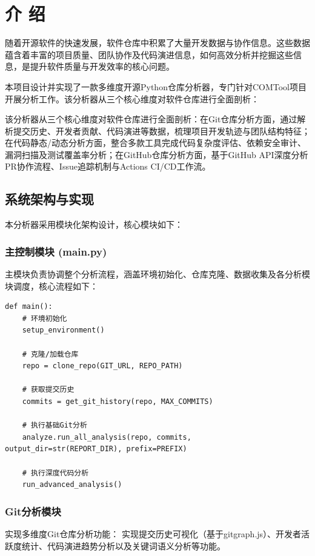 \chapter*{\hfill 介  绍 \hfill}
\label{chap00:introduction}

随着开源软件的快速发展，软件仓库中积累了大量开发数据与协作信息。这些数据蕴含着丰富的项目质量、团队协作及代码演进信息，如何高效分析并挖掘这些信息，是提升软件质量与开发效率的核心问题。

本项目设计并实现了一款多维度开源Python仓库分析器，专门针对COMTool项目开展分析工作。该分析器从三个核心维度对软件仓库进行全面剖析：

该分析器从三个核心维度对软件仓库进行全面剖析：在Git仓库分析方面，通过解析提交历史、开发者贡献、代码演进等数据，梳理项目开发轨迹与团队结构特征；在代码静态/动态分析方面，整合多款工具完成代码复杂度评估、依赖安全审计、漏洞扫描及测试覆盖率分析；在GitHub仓库分析方面，基于GitHub API深度分析PR协作流程、Issue追踪机制与Actions CI/CD工作流。

\section{系统架构与实现}

本分析器采用模块化架构设计，核心模块如下：

\subsection{主控制模块 (main.py)}
主模块负责协调整个分析流程，涵盖环境初始化、仓库克隆、数据收集及各分析模块调度，核心流程如下：

\begin{verbatim}
def main():
    # 环境初始化
    setup_environment()

    # 克隆/加载仓库
    repo = clone_repo(GIT_URL, REPO_PATH)

    # 获取提交历史
    commits = get_git_history(repo, MAX_COMMITS)

    # 执行基础Git分析
    analyze.run_all_analysis(repo, commits, output_dir=str(REPORT_DIR), prefix=PREFIX)

    # 执行深度代码分析
    run_advanced_analysis()
\end{verbatim}

\subsection{Git分析模块}
实现多维度Git仓库分析功能：
实现提交历史可视化（基于gitgraph.js）、开发者活跃度统计、代码演进趋势分析以及关键词语义分析等功能。

